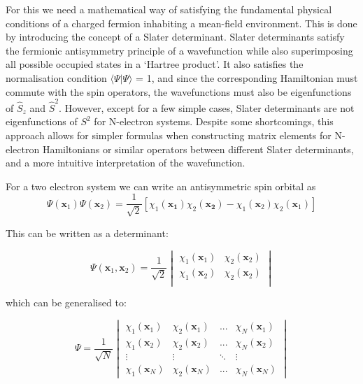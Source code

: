 \documentclass[10pt]{article}
\begin{document}


For this we need a mathematical way of satisfying the fundamental physical conditions of a charged fermion inhabiting a mean-field environment. This is done by introducing the concept of a Slater determinant. Slater determinants satisfy the fermionic antisymmetry principle of a wavefunction while also superimposing all possible occupied states in a `Hartree product'. It also satisfies the normalisation condition $\langle \Psi | \Psi \rangle$ = 1, and since the corresponding Hamiltonian must commute with the spin operators, the wavefunctions must also be eigenfunctions of $\hat{S}_z$ and $\hat{S}^2$. However, except for a few simple cases, Slater determinants are not eigenfunctions of $S^2$ for N-electron systems. Despite some shortcomings, this approach allows for simpler formulas when constructing matrix elements for N-electron Hamiltonians or similar operators between different Slater determinants, and a more intuitive interpretation of the wavefunction.

For a two electron system we can write an antisymmetric spin orbital as $$\Psi(\mathbf{x}_1)\Psi(\mathbf{x}_2) = \frac{1}{\sqrt{2}}[\chi_1(\mathbf{x_1})\chi_2(\mathbf{x_2})-\chi_1(\mathbf{x}_2)\chi_2(\mathbf{x}_1)]$$

This can be written as a determinant:

\begin{equation*}
	\Psi(\mathbf{x}_1,\mathbf{x}_2) = \frac{1}{\sqrt{2}}
\begin{vmatrix}
	\chi_1(\mathbf{x}_1) & \chi_2(\mathbf{x}_2)\\
	\chi_1(\mathbf{x}_2) & \chi_2(\mathbf{x}_2) \\
	\end{vmatrix}
\end{equation*}

which can be generalised to:

\begin{equation}
	\Psi = \frac{1}{\sqrt{N}}
	\begin{vmatrix}
	\chi_1(\mathbf{x}_1) & \chi_2(\mathbf{x}_1) & ... & \chi_N(\mathbf{x}_1) \\
	\chi_1(\mathbf{x}_2) & \chi_2(\mathbf{x}_2) & ... & \chi_N(\mathbf{x}_2) \\
	\vdots & \vdots &\ddots & \vdots \\
	\chi_1(\mathbf{x}_N) & \chi_2(\mathbf{x}_N) & ... & \chi_N(\mathbf{x}_N)
	\end{vmatrix}
\end{equation}
\end{document}
